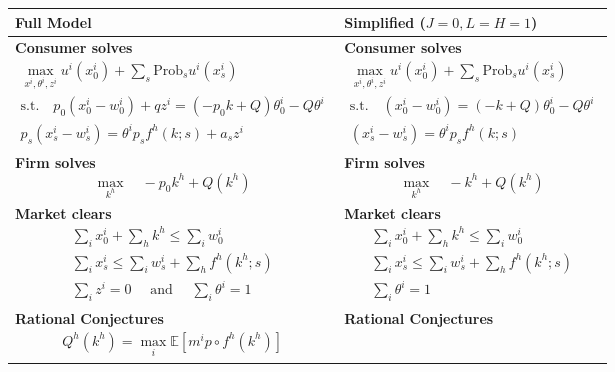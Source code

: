 \begin{table}[htbp]
\centering
\begin{tabular}{|m{8cm}|m{6cm}|}
\hline
\textbf{Full Model} & \textbf{Simplified ($J = 0, L = H = 1$)} \\ \hline
\noindent \textbf{Consumer solves}
\begin{align*}
    \max_{x^i, \theta^i, z^i} u^i(x^i_0) + \sum_s \text{Prob}_s u^i(x^i_s)  \\
    \text{s.t.} \quad p_0 (x^i_0 - w^i_0) + q z^i = (-p_0 k + Q) \theta^i_0 - Q \theta^i \\
    p_s (x^i_s - w^i_s) = \theta^i p_s f^h(k;s) + a_s z^i
\end{align*}
& 
\noindent \textbf{Consumer solves}
\begin{align*}
    \max_{x^i, \theta^i, z^i} u^i(x^i_0) + \sum_s \text{Prob}_s u^i(x^i_s)  \\
    \text{s.t.} \quad  (x^i_0 - w^i_0)  = (- k + Q) \theta^i_0 - Q \theta^i \\
   (x^i_s - w^i_s) = \theta^i p_s f^h(k;s) 
\end{align*} 
\vspace{-2mm} \\ \hline
\noindent \textbf{Firm solves} 
\[
\max_{k^h} \quad - p_0 k^h + Q(k^h)
\]
& 
\noindent \textbf{Firm solves} 
\[
\max_{k^h} \quad - k^h + Q(k^h)
\]
\vspace{-2mm} \\ \hline
\noindent \textbf{Market clears} 
\begin{align*}
\sum_i x^i_0 + \sum_h k^h \leq \sum_i w^i_0 \\ 
\sum_i x^i_s \leq \sum_i w^i_s + \sum_h f^h(k^h;s) \\ 
\sum_i z^i = 0 \quad \text{ and } \quad \sum_i \theta^i = 1
\end{align*} 
& 
\noindent \textbf{Market clears} 
\begin{align*}
\sum_i x^i_0 + \sum_h k^h \leq \sum_i w^i_0 \\ 
\sum_i x^i_s \leq \sum_i w^i_s + \sum_h f^h(k^h;s) \\
\sum_i \theta^i = 1
\end{align*} 
\vspace{-2mm} \\ \hline
\noindent \textbf{Rational Conjectures} 
\begin{align*}
Q^h(k^h) = \max_i \mathbb{E}[m^i p \circ f^h(k^h)]
\end{align*} 
& 
\noindent \textbf{Rational Conjectures} 
\begin{align*}

\end{align*}
\end{tabular}
\end{table}
